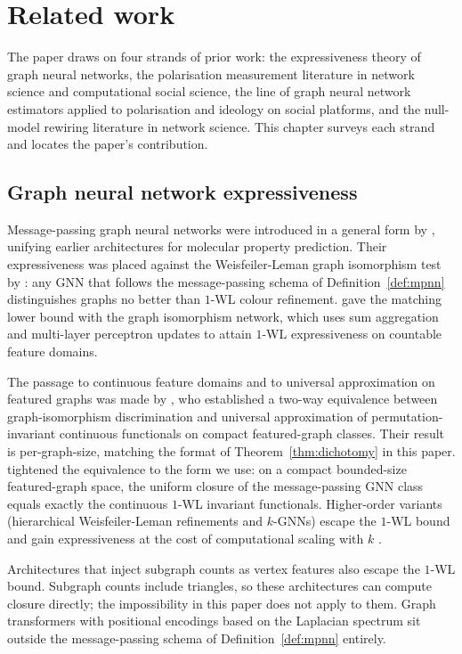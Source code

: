 
\section{Related work}\label{sec:related}

The paper draws on four strands of prior work: the expressiveness
theory of graph neural networks, the polarisation measurement
literature in network science and computational social science, the
line of graph neural network estimators applied to polarisation and
ideology on social platforms, and the null-model rewiring literature
in network science. This chapter surveys each strand and locates the
paper's contribution.

\subsection{Graph neural network expressiveness}

Message-passing graph neural networks were introduced in a general
form by \citet{GilmerNeuralMessagePassing2017}, unifying earlier
architectures for molecular property prediction. Their expressiveness
was placed against the Weisfeiler-Leman graph isomorphism test by
\citet{MorrisWL2019}: any GNN that follows the message-passing schema
of Definition~\ref{def:mpnn} distinguishes graphs no better than $1$-WL colour
refinement. \citet{XuGIN2019} gave the matching lower bound with the
graph isomorphism network, which uses sum aggregation and multi-layer
perceptron updates to attain $1$-WL expressiveness on countable
feature domains.

The passage to continuous feature domains and to universal
approximation on featured graphs was made by \citet{ChenVillar2019},
who established a two-way equivalence between graph-isomorphism
discrimination and universal approximation of permutation-invariant
continuous functionals on compact featured-graph classes. Their
result is per-graph-size, matching the format of Theorem~\ref{thm:dichotomy}
in this paper. \citet{AzizianLelarge2021} tightened the equivalence
to the form we use: on a compact bounded-size featured-graph space,
the uniform closure of the message-passing GNN class equals exactly
the continuous $1$-WL invariant functionals. Higher-order variants
(hierarchical Weisfeiler-Leman refinements and $k$-GNNs) escape the
$1$-WL bound and gain expressiveness at the cost of computational
scaling with $k$ \citep{MorrisWL2019}.

Architectures that inject subgraph counts as vertex features
\citep{Bouritsas2022} also escape the $1$-WL bound. Subgraph counts
include triangles, so these architectures can compute closure
directly; the impossibility in this paper does not apply to them.
Graph transformers with positional encodings based on the Laplacian
spectrum sit outside the message-passing schema of Definition~\ref{def:mpnn}
entirely.

